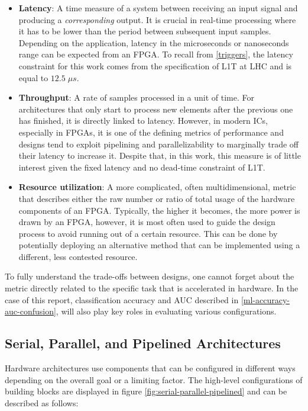 \begin{itemize}
  \item \textbf{Latency}: A time measure of a system between receiving an input signal and producing a \textit{corresponding} output. It is crucial in real-time processing where it has to be lower than the period between subsequent input samples. Depending on the application, latency in the microseconds or nanoseconds range can be expected from an FPGA. To recall from \cref{triggers}, the latency constraint for this work comes from the specification of L1T at LHC and is equal to \(12.5\; \mu s\).
  \item \textbf{Throughput}: A rate of samples processed in a unit of time. For architectures that only start to process new elements after the previous one has finished, it is directly linked to latency. However, in modern ICs, especially in FPGAs, it is one of the defining metrics of performance and designs tend to exploit pipelining and parallelizability to marginally trade off their latency to increase it. Despite that, in this work, this measure is of little interest given the fixed latency and no dead-time constraint of L1T.
  \item \textbf{Resource utilization}: A more complicated, often multidimensional, metric that describes either the raw number or ratio of total usage of the hardware components of an FPGA. Typically, the higher it becomes, the more power is drawn by an FPGA, however, it is most often used to guide the design process to avoid running out of a certain resource. This can be done by potentially deploying an alternative method that can be implemented using a different, less contested resource. 
\end{itemize}

To fully understand the trade-offs between designs, one cannot forget about the metric directly related to the specific task that is accelerated in hardware. In the case of this report, classification accuracy and AUC described in \cref{ml-accuracy-auc-confusion}, will also play key roles in evaluating various configurations.

\subsection{Serial, Parallel, and Pipelined Architectures}\label{serial-parallel-pipelined}
Hardware architectures use components that can be configured in different ways depending on the overall goal or a limiting factor. The high-level configurations of building blocks are displayed in figure \ref{fig:serial-parallel-pipelined} and can be described as follows:

